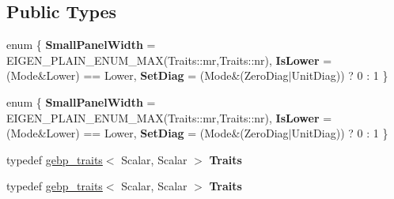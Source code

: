 \subsection*{Public Types}
\begin{DoxyCompactItemize}
\item 
\mbox{\label{struct_eigen_1_1internal_1_1product__triangular__matrix__matrix_3_01_scalar_00_01_index_00_01_mo073ec17ef20b8a50e2a38e240dd8d795_a62374396e3a6c8a347a533fd693195b4}} 
enum \{ {\bfseries Small\+Panel\+Width} = E\+I\+G\+E\+N\+\_\+\+P\+L\+A\+I\+N\+\_\+\+E\+N\+U\+M\+\_\+\+M\+AX(Traits\+:\+:mr,Traits\+:\+:nr), 
{\bfseries Is\+Lower} = (Mode\&Lower) == Lower, 
{\bfseries Set\+Diag} = (Mode\&(Zero\+Diag$\vert$\+Unit\+Diag)) ? 0 \+: 1
 \}
\item 
\mbox{\label{struct_eigen_1_1internal_1_1product__triangular__matrix__matrix_3_01_scalar_00_01_index_00_01_mo073ec17ef20b8a50e2a38e240dd8d795_a7cd4fc3d2cdaf248a8e7700b8298865f}} 
enum \{ {\bfseries Small\+Panel\+Width} = E\+I\+G\+E\+N\+\_\+\+P\+L\+A\+I\+N\+\_\+\+E\+N\+U\+M\+\_\+\+M\+AX(Traits\+:\+:mr,Traits\+:\+:nr), 
{\bfseries Is\+Lower} = (Mode\&Lower) == Lower, 
{\bfseries Set\+Diag} = (Mode\&(Zero\+Diag$\vert$\+Unit\+Diag)) ? 0 \+: 1
 \}
\item 
\mbox{\label{struct_eigen_1_1internal_1_1product__triangular__matrix__matrix_3_01_scalar_00_01_index_00_01_mo073ec17ef20b8a50e2a38e240dd8d795_afbc7bbc5adffa2e0e67e9f13238fcf35}} 
typedef \hyperlink{class_eigen_1_1internal_1_1gebp__traits}{gebp\+\_\+traits}$<$ Scalar, Scalar $>$ {\bfseries Traits}
\item 
\mbox{\label{struct_eigen_1_1internal_1_1product__triangular__matrix__matrix_3_01_scalar_00_01_index_00_01_mo073ec17ef20b8a50e2a38e240dd8d795_afbc7bbc5adffa2e0e67e9f13238fcf35}} 
typedef \hyperlink{class_eigen_1_1internal_1_1gebp__traits}{gebp\+\_\+traits}$<$ Scalar, Scalar $>$ {\bfseries Traits}
\end{DoxyCompactItemize}
